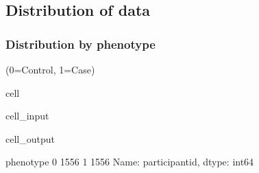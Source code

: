 \documentclass[letterpaper,10pt,english]{jupyterBook}
\begin{document}
\subsection{Distribution of data}
\label{\detokenize{Cooper:distribution-of-data}}

\subsubsection{Distribution by phenotype}
\label{\detokenize{Cooper:distribution-by-phenotype}}
\sphinxAtStartPar
(0=Control, 1=Case)

\begin{sphinxuseclass}{cell}\begin{sphinxVerbatimInput}

\begin{sphinxuseclass}{cell_input}
\begin{sphinxVerbatim}[commandchars=\\\{\}]
\PYG{p}{[}\PYG{p}{]}
\end{sphinxVerbatim}

\end{sphinxuseclass}\end{sphinxVerbatimInput}
\begin{sphinxVerbatimOutput}

\begin{sphinxuseclass}{cell_output}
\begin{sphinxVerbatim}[commandchars=\\\{\}]
phenotype
0    1556
1    1556
Name: participant\PYGZus{}id, dtype: int64
\end{sphinxVerbatim}

\end{sphinxuseclass}\end{sphinxVerbatimOutput}

\end{sphinxuseclass}
\end{document}

